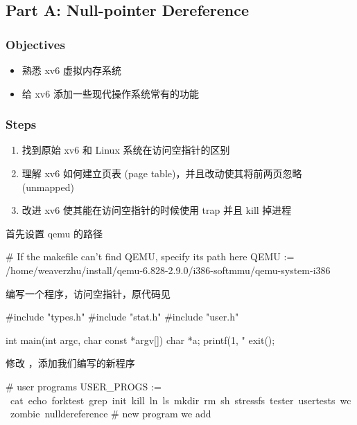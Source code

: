 \subsection{Part A: Null-pointer Dereference}
\subsubsection{Objectives}


\begin{itemize}
    \item 熟悉 xv6 虚拟内存系统
    \item 给 xv6 添加一些现代操作系统常有的功能
\end{itemize}

\subsubsection{Steps}

\begin{enumerate}
    \item 找到原始 xv6 和 Linux 系统在访问空指针的区别
    \item 理解 xv6 如何建立页表 (page table)，并且改动使其将前两页忽略 (unmapped)
    \item 改进 xv6 使其能在访问空指针的时候使用 trap 并且 kill 掉进程
\end{enumerate}

首先设置 qemu 的路径

\begin{textcode}
    # If the makefile can't find QEMU, specify its path here
    QEMU := /home/weaverzhu/install/qemu-6.828-2.9.0/i386-softmmu/qemu-system-i386
\end{textcode}

编写一个程序，访问空指针，原代码见 


\begin{ccode}
    #include "types.h"
    #include "stat.h"
    #include "user.h"
        
    int main(int argc, char const *argv[])
    {
        char *a;
        printf(1, "%
        exit();
    }
\end{ccode}

修改 ，添加我们编写的新程序

\begin{bashcode}
    # user programs
    USER_PROGS := \
    cat\
    echo\
    forktest\
    grep\
    init\
    kill\
    ln\
    ls\
    mkdir\
    rm\
    sh\
    stressfs\
    tester\
    usertests\
    wc\
    zombie\
    nulldereference # new program we add
\end{bashcode}

